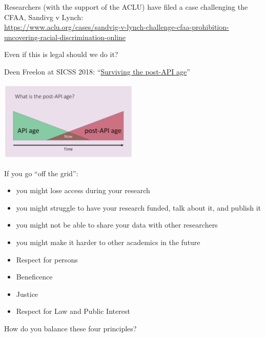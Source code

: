\documentclass{beamer}
\def\vf{\vfill}
\begin{document}
\begin{frame}

Researchers (with the support of the ACLU) have filed a case challenging the CFAA, Sandivg v Lynch:\\
\tiny{\textcolor{blue}{\url{https://www.aclu.org/cases/sandvig-v-lynch-challenge-cfaa-prohibition-uncovering-racial-discrimination-online}}}

\end{frame}
\begin{frame}

Even if this is legal should we do it? \pause

Deen Freelon at SICSS 2018: ``\textcolor{blue}{\href{https://www.youtube.com/watch?v=GWpCHh54pXU}{Surviving the post-API age}}''

\begin{center}
\includegraphics[width=0.5\textwidth]{figures/freelon_postapi_screengrab}
\end{center}


If you go ``off the grid'': \pause
\begin{itemize}
\item you might lose access during your research
\pause
\item you might struggle to have your research funded, talk about it, and publish it
\pause
\item you might not be able to share your data with other researchers
\pause
\item you might make it harder to other academics in the future
\end{itemize}

\end{frame}
\begin{frame}

\begin{itemize}
\item Respect for persons
\item Beneficence
\item Justice
\item Respect for Law and Public Interest
\end{itemize}

\vf
How do you balance these four principles?

\end{frame}
\end{document}
